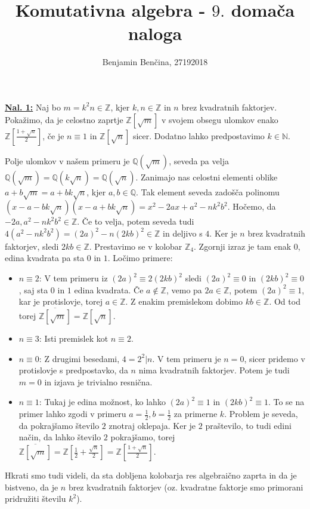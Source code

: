 \documentclass[a4paper, 12pt]{article}
\title{Komutativna algebra - $9.$ domača naloga}
\author{Benjamin Benčina, 27192018}
\newcommand{\N}{\mathbb{N}}
\newcommand{\Z}{\mathbb{Z}}
\newcommand{\Q}{\mathbb{Q}}
\newcommand{\closure}[1]{\overline{#1}}
\begin{document}
\maketitle

\underline{\textbf{Nal. 1:}}
Naj bo $m = k^2n \in \Z$, kjer $k, n \in \Z$ in $n$ brez kvadratnih faktorjev. Pokažimo, da je celostno zaprtje $\Z[\sqrt{m}]$ v svojem obsegu ulomkov enako $\Z[\frac{1 + \sqrt{n}}{2}]$, če je $n \equiv 1$ in $\Z[\sqrt{n}]$ sicer. Dodatno lahko predpostavimo $k \in \N$.

Polje ulomkov v našem primeru je $\Q(\sqrt{m})$, seveda pa velja $\Q(\sqrt{m}) = \Q(k\sqrt{n}) = \Q(\sqrt{n})$. Zanimajo nas celostni elementi oblike $a + b \sqrt{m} = a + bk\sqrt{n}$, kjer $a, b \in \Q$. Tak element seveda zadošča polinomu $(x - a - bk\sqrt{n})(x - a + bk\sqrt{n}) = x^2 - 2ax + a^2 - nk^2b^2$. Hočemo, da $-2a, a^2 - nk^2b^2 \in \Z$. Če to velja, potem seveda tudi $4(a^2 - nk^2b^2) = (2a)^2 - n(2kb)^2 \in \Z$ in deljivo s $4$. Ker je $n$ brez kvadratnih faktorjev, sledi $2kb \in \Z$. Prestavimo se v kolobar $\Z_4$. Zgornji izraz je tam enak $0$, edina kvadrata pa sta $0$ in $1$. Ločimo primere:
\begin{itemize}
	\item $n \equiv 2$: V tem primeru iz $(2a)^2 \equiv 2(2kb)^2$ sledi $(2a)^2 \equiv 0$ in $(2kb)^2 \equiv 0$, saj sta $0$ in $1$ edina kvadrata. Če $a \notin \Z$, vemo pa $2a \in \Z$, potem $(2a)^2 \equiv 1$, kar je protislovje, torej $a \in \Z$. Z enakim premislekom dobimo $kb \in \Z$. Od tod torej $\closure{\Z[\sqrt{m}]} = \Z[\sqrt{n}]$.
	\item $n \equiv 3$: Isti premislek kot $n \equiv 2$.
	\item $n \equiv 0$: Z drugimi besedami, $4 = 2^2 | n$. V tem primeru je $n = 0$, sicer pridemo v protislovje s predpostavko, da $n$ nima kvadratnih faktorjev. Potem je tudi $m = 0$ in izjava je trivialno resnična.
	\item $n \equiv 1$: Tukaj je edina možnost, ko lahko $(2a)^2 \equiv 1$ in $(2kb)^2 \equiv 1$. To se na primer lahko zgodi v primeru $a = \frac{1}{2}, b = \frac{1}{2}$ za primerne $k$. Problem je seveda, da pokrajšamo število $2$ znotraj oklepaja. Ker je $2$ praštevilo, to tudi edini način, da lahko število $2$ pokrajšamo, torej $\closure{\Z[\sqrt{m}]} = \Z[\frac{1}{2} + \frac{\sqrt{n}}{2}] = \Z[\frac{1 + \sqrt{n}}{2}]$.
\end{itemize}

Hkrati smo tudi videli, da sta dobljena kolobarja res algebraično zaprta in da je bistveno, da je $n$ brez kvadratnih faktorjev (oz. kvadratne faktorje smo primorani pridružiti številu $k^2$).
\newline
\end{document}
